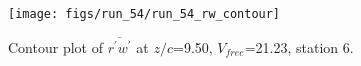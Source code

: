 \begin{figure}[H]
\centering
\texttt{[image: figs/run\_54/run\_54\_rw\_contour]}
\caption{Contour plot of $\overline{r^\prime w^\prime}$ at $z/c$=9.50, $V_{free}$=21.23, station 6.}
\label{fig:run_54_rw_contour}
\end{figure}


